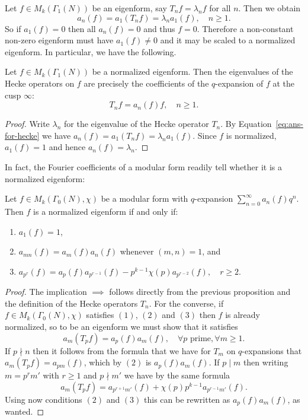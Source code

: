 Let $f\in M_k(\Gamma_1(N))$ be an eigenform, say $T_nf=\lambda_n f$ for all $n$. Then we obtain
\[
a_n(f) = a_1(T_n f) = \lambda_n a_1(f),\quad n\geq 1.
\]
So if $a_1(f)=0$ then all $a_n(f)=0$ and thus $f=0$. Therefore a non-constant non-zero eigenform must have $a_1(f)\neq 0$ and it may be scaled to a normalized eigenform. In particular, we have the following.
\begin{theorem}
  Let $f\in M_k(\Gamma_1(N))$ be a normalized eigenform. Then the eigenvalues of the Hecke operators on $f$ are precisely the coefficients of the $q$-expansion of $f$ at the cusp $\infty$:
\begin{equation}
\label{eq:ans-for-hecke}
T_n f = a_n(f) f,\quad n\geq 1.
\end{equation}
\end{theorem}
\begin{proof}
Write $\lambda_n$ for the eigenvalue of the Hecke operator $T_n$. By Equation~\eqref{eq:ans-for-hecke} we have $a_n(f) = a_1(T_n f) = \lambda_n a_1(f)$. Since $f$ is normalized, $a_1(f)=1$ and hence $a_n(f) = \lambda_n$.
\end{proof}
In fact, the Fourier coefficients of a modular form readily tell whether it is a normalized eigenform:
\begin{proposition}
\label{proposition:coeffsnormalizedeigen}
  Let $f\in M_k(\Gamma_0(N),\chi)$ be a modular form with $q$-expansion $\sum_{n=0}^\infty a_n(f) q^n$. Then $f$ is a normalized eigenform if and only if:
  \begin{enumerate}
  \item $a_1(f) = 1$,
  \item $a_{mn}(f) = a_m(f) a_n(f)$ whenever $(m,n)=1$, and
\item $a_{p^r}(f) = a_p(f)a_{p^{r-1}}(f) - p^{k-1}\chi(p) a_{p^{r-2}}(f),\quad r\geq 2$.
  \end{enumerate}
\end{proposition}
\begin{proof}
  The implication $\implies$ follows directly from the previous proposition and the definition of the Hecke operators $T_n$. For the converse, if $f\in M_k(\Gamma_0(N),\chi)$ satisfies $(1)$, $(2)$ and $(3)$ then $f$ is already normalized, so to be an eigenform we must show that it satisfies
\[
a_m(T_pf)=a_p(f)a_m(f),\quad \forall p\text{ prime}, \forall m\geq 1.
\]
If $p\nmid n$ then it follows from the formula that we have for $T_m$ on $q$-expansions that $a_m(T_pf)=a_{pm}(f)$, which by $(2)$ is $a_p(f)a_m(f)$. If $p\mid m$ then writing $m=p^rm'$ with $r\geq 1$ and $p\nmid m'$ we have by the same formula
\[
a_m(T_pf) = a_{p^{r+1}m'}(f) + \chi(p)p^{k-1}a_{p^{r-1}m'}(f).
\]
Using now conditions $(2)$ and $(3)$ this can be rewritten as $a_p(f)a_m(f)$, as wanted.
\end{proof}
